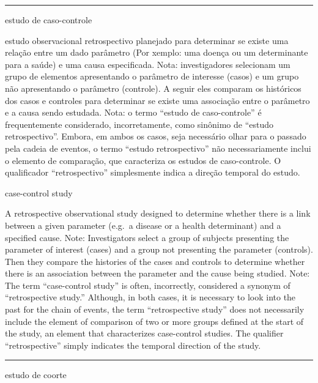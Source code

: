 \documentclass[
  openany]{book}
\begin{document}
\begin{center}\rule{0.5\linewidth}{0.5pt}\end{center}

estudo de caso-controle

estudo observacional retrospectivo planejado para determinar se existe uma relação entre um dado parâmetro (Por xemplo: uma doença ou um determinante para a saúde) e uma causa especificada. Nota: investigadores selecionam um grupo de elementos apresentando o parâmetro de interesse (casos) e um grupo não apresentando o parâmetro (controle). A seguir eles comparam os históricos dos casos e controles para determinar se existe uma associação entre o parâmetro e a causa sendo estudada. Nota: o termo ``estudo de caso-controle'' é frequentemente considerado, incorretamente, como sinônimo de ``estudo retrospectivo''. Embora, em ambos os casos, seja necessário olhar para o passado pela cadeia de eventos, o termo ``estudo retrospectivo'' não necessariamente inclui o elemento de comparação, que caracteriza os estudos de caso-controle. O qualificador ``retrospectivo'' simplesmente indica a direção temporal do estudo.

case-control study

A retrospective observational study designed to determine whether there is a link between a given parameter (e.g.~a disease or a health determinant) and a specified cause. Note: Investigators select a group of subjects presenting the parameter of interest (cases) and a group not presenting the parameter (controls). Then they compare the histories of the cases and controls to determine whether there is an association between the parameter and the cause being studied. Note: The term ``case-control study'' is often, incorrectly, considered a synonym of ``retrospective study.'' Although, in both cases, it is necessary to look into the past for the chain of events, the term ``retrospective study'' does not necessarily include the element of comparison of two or more groups defined at the start of the study, an element that characterizes case-control studies. The qualifier ``retrospective'' simply indicates the temporal direction of the study.

\begin{center}\rule{0.5\linewidth}{0.5pt}\end{center}

estudo de coorte
\end{document}
